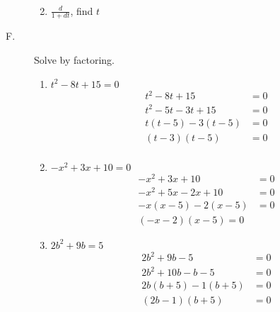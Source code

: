 \documentclass{article}
\begin{document}
\begin{description}
\begin{enumerate}
\begin{equation}
\begin{split}
                      \end{split}
                  \end{equation}
            \item $\frac{d}{1+dt}$, find $t$
        \end{enumerate}
    \item[F. ] Solve by factoring.
        \begin{enumerate}
            \item $t^2 - 8t + 15 = 0$
                  \begin{equation}
                      \begin{split}
                          t^2 - 8t + 15 & = 0 \\
                          t^2 - 5t -3t + 15 & = 0 \\
                          t(t - 5)-3(t-5) & = 0 \\
                          (t-3)(t-5) & = 0 \\
                      \end{split}
                  \end{equation}
            \item $ -x^2 + 3x + 10 = 0 $
                  \begin{equation}
                      \begin{split}
                          -x^2 + 3x + 10 & = 0 \\
                          -x^2 + 5x - 2x + 10 & = 0 \\
                          -x(x - 5) -2 (x - 5) & = 0 \\
                          (-x - 2) (x - 5) = 0
                      \end{split}
                  \end{equation}
            \item $2b^2 + 9b = 5$
                  \begin{equation}
                      \begin{split}
                          2b^2+ 9b - 5 & = 0 \\
                          2b^2 + 10b - b - 5 & = 0 \\
                          2b(b+5) - 1(b+5) & = 0 \\
                          (2b -1 ) (b+5) & = 0 \\
                      \end{split}
                  \end{equation}
        \end{enumerate}


\end{description}
\end{document}
